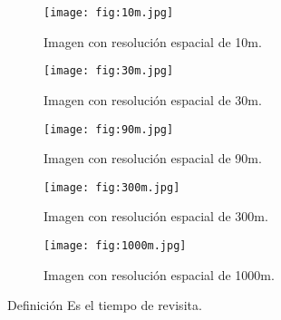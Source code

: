 
\begin{frame}{}
    \begin{figure}[h!]
        \centering
        \texttt{[image: fig:10m.jpg]}
        \caption{Imagen con resolución espacial de 10m.}
    \end{figure}
\end{frame}

\begin{frame}{}
    \begin{figure}[h!]
        \centering
        \texttt{[image: fig:30m.jpg]}
        \caption{Imagen con resolución espacial de 30m.}
    \end{figure}
\end{frame}

\begin{frame}{}
    \begin{figure}[h!]
        \centering
        \texttt{[image: fig:90m.jpg]}
        \caption{Imagen con resolución espacial de 90m.}
    \end{figure}
\end{frame}

\begin{frame}{}
    \begin{figure}[h!]
        \centering
        \texttt{[image: fig:300m.jpg]}
        \caption{Imagen con resolución espacial de 300m.}
    \end{figure}
\end{frame}

\begin{frame}{}
    \begin{figure}[h!]
        \centering
        \texttt{[image: fig:1000m.jpg]}
        \caption{Imagen con resolución espacial de 1000m.}
    \end{figure}
\end{frame}
\begin{frame}{}

\end{frame}

\begin{frame}{}
    \begin{block}{Definición}
        Es el tiempo de revisita.
    \end{block}
\end{frame}


